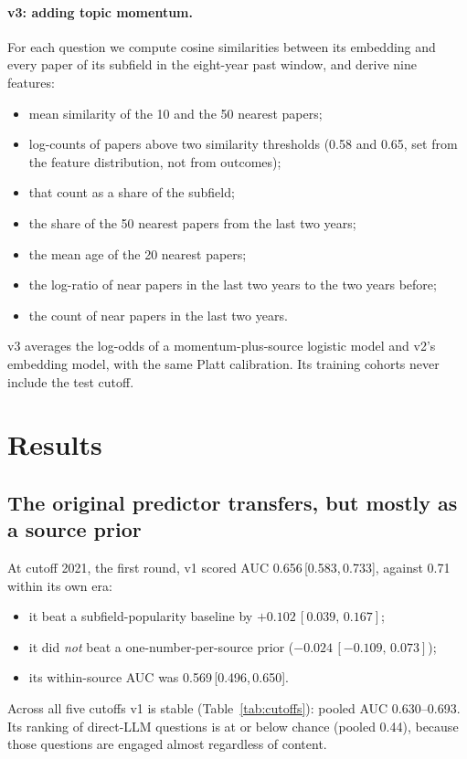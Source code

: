 \documentclass[11pt]{article}
\newcommand{\ci}[2]{\,[#1,\,#2]}
\begin{document}
\paragraph{v3: adding topic momentum.} For each question we compute cosine
similarities between its embedding and every paper of its subfield in the
eight-year past window, and derive nine features:
\begin{itemize}
\item mean similarity of the 10 and the 50 nearest papers;
\item log-counts of papers above two similarity thresholds (0.58 and 0.65,
  set from the feature distribution, not from outcomes);
\item that count as a share of the subfield;
\item the share of the 50 nearest papers from the last two years;
\item the mean age of the 20 nearest papers;
\item the log-ratio of near papers in the last two years to the two years
  before;
\item the count of near papers in the last two years.
\end{itemize}
v3 averages the log-odds of a momentum-plus-source logistic model and v2's
embedding model, with the same Platt calibration. Its training cohorts never
include the test cutoff.

\section{Results}\label{sec:results}

\subsection{The original predictor transfers, but mostly as a source prior}\label{sec:r1}

At cutoff 2021, the first round, v1 scored AUC 0.656\ci{0.583}{0.733},
against 0.71 within its own era:
\begin{itemize}
\item it beat a subfield-popularity baseline by $+0.102\ci{0.039}{0.167}$;
\item it did \emph{not} beat a one-number-per-source prior
  ($-0.024\ci{-0.109}{0.073}$);
\item its within-source AUC was 0.569\ci{0.496}{0.650}.
\end{itemize}
Across all five cutoffs v1 is stable (Table~\ref{tab:cutoffs}): pooled AUC
0.630--0.693. Its ranking of direct-LLM questions is at or below chance
(pooled 0.44), because those questions are engaged almost regardless of
content.
\end{document}
